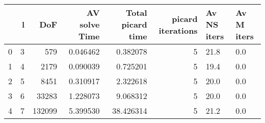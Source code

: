 \begin{tabular}{lrrrrrll}
\toprule
{} &  l &     DoF &  AV solve Time &  Total picard time &  picard iterations & Av NS iters & Av M iters \\
\midrule
0 &  3 &     579 &       0.046462 &           0.382078 &                  5 &        21.8 &        0.0 \\
1 &  4 &    2179 &       0.090039 &           0.725201 &                  5 &        19.4 &        0.0 \\
2 &  5 &    8451 &       0.310917 &           2.322618 &                  5 &        20.0 &        0.0 \\
3 &  6 &   33283 &       1.228073 &           9.068312 &                  5 &        20.0 &        0.0 \\
4 &  7 &  132099 &       5.399530 &          38.426314 &                  5 &        21.2 &        0.0 \\
\bottomrule
\end{tabular}
